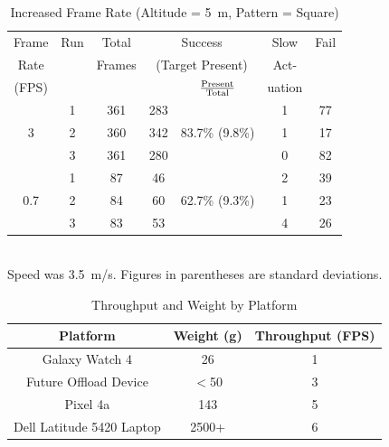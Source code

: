 \begin{table}
        \centering\small
        \begin{tabular}{|c|c|c|c|c|c|c|}
                \hline
                Frame & Run & Total & \multicolumn{2}{c|}{Success} & Slow & Fail\\
                Rate  &  & Frames  & \multicolumn{2}{c|}{{\footnotesize (Target Present)}}& Act-  &  \\
                \cline{5-5}
                (FPS) &  &         &         & $\rm \frac{Present}{Total}$  & uation  & \\
                \hline
                & 1 & 361 & 283 &        & 1 &  77 \\
                3& 2 & 360 & 342 & 83.7\% \scriptsize{(9.8\%)} & 1 & 17 \\
                & 3 & 361 & 280 &        & 0 &  82 \\
                \hline
                    & 1 & 87 & 46 & & 2 & 39 \\
                0.7 & 2 & 84 & 60 & 62.7\% \scriptsize{(9.3\%)} & 1 & 23  \\
                & 3 & 83 & 53 & & 4 & 26 \\
                \hline
        \end{tabular}
        \begin{captext}
                \centering \\[0.1cm] Speed was 3.5~m/s.  Figures in parentheses are standard deviations.
        \end{captext}
        \caption{Increased Frame Rate {\footnotesize (Altitude = 5~m, Pattern = Square)}}
        \label{tab:taskfps-results}
\end{table}

\begin{table}
        \centering\small
        \begin{tabular}{|c|c|c|}
                \hline
                Platform & Weight (g) & Throughput (FPS)\\
                \hline
                Galaxy Watch 4 & 26 & 1 \\
                Future Offload Device & $<$50 & 3\\
                Pixel 4a & 143 & 5 \\
                Dell Latitude 5420 Laptop & 2500+ & 6 \\
                \hline
        \end{tabular}\\
        \caption{Throughput and Weight by Platform}
        \label{tab:throughput}
\end{table}

